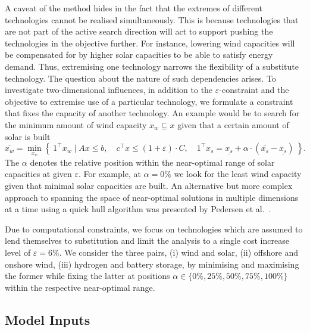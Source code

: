A caveat of the method hides in the fact that the extremes
of different technologies cannot be realised simultaneously.
This is because technologies that are not part of the active search direction
will act to support pushing the technologies in the objective further.
For instance, lowering wind capacities will be compensated for
by higher solar capacities to be able to satisfy energy demand.
Thus, extremising one technology narrows the flexibility of a substitute technology.
The question about the nature of such dependencies arises.
To investigate two-dimensional influences,
in addition to the $\varepsilon$-constraint and the objective to
extremise use of a particular technology,
we formulate a constraint that fixes the capacity of another technology.
An example would be to search for the minimum amount of wind capacity $x_w \subseteq x$ 
given that a certain amount of solar is built
\begin{equation}
    \overline{x_w} = \min_{x_w}\left\{\:1^\top x_w \mid Ax\leq b,\quad c^\top x\leq (1+\varepsilon)\cdot C, \quad 1^\top x_s = \underline{x_s} + \alpha \cdot (\overline{x_s}-\underline{x_s}) \:\right\}.
\end{equation}
The $\alpha$ denotes the relative position within the near-optimal
range of solar capacities at given $\varepsilon$.
For example, at $\alpha=0\%$ we look for the least wind capacity
given that minimal solar capacities are built. 
An alternative but more complex approach to spanning the space of near-optimal solutions in multiple dimensions at a time
using a quick hull algorithm was presented by Pedersen et al.~\cite{pedersen_modeling_2020}.

Due to computational constraints, we focus on technologies which
are assumed to lend themselves to substitution and limit the analysis to a single
cost increase level of $\varepsilon=6\%$.
We consider the three pairs,
(i) wind and solar,
(ii) offshore and onshore wind,
(iii) hydrogen and battery storage,
by minimising and maximising the former while
fixing the latter at positions $\alpha \in \{0\%,25\%,50\%,75\%,100\%\}$
within the respective near-optimal range.

\subsection{Model Inputs}
\label{sec:inputs}

